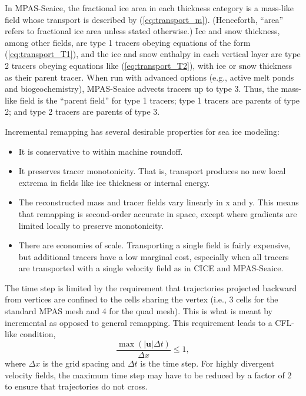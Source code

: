 In MPAS-Seaice, the fractional ice area in each thickness category is a mass-like field whose transport is described by (\ref{eq:transport_m}). (Henceforth, ``area'' refers to fractional ice area unless stated otherwise.) Ice and snow thickness, among other fields, are type 1 tracers obeying equations of the form (\ref{eq:transport_T1}), and the ice and snow enthalpy in each vertical layer are type 2 tracers obeying equations like (\ref{eq:transport_T2}), with ice or snow thickness as their parent tracer. When run with advanced options (e.g., active melt ponds and biogeochemistry), MPAS-Seaice advects tracers up to type 3. Thus, the mass-like field is the ``parent field'' for type 1 tracers; type 1 tracers are parents of type 2; and type 2 tracers are parents of type 3.

Incremental remapping has several desirable properties for sea ice modeling:
\begin{itemize}
\item It is conservative to within machine roundoff.
\item It preserves tracer monotonicity.  That is, transport produces no new local extrema in fields like ice thickness or internal energy. 
\item The reconstructed mass and tracer fields vary linearly in x and y. This means that remapping is second-order accurate in space, except where gradients are limited locally to preserve monotonicity.
\item There are economies of scale.  Transporting a single field is fairly expensive, but additional tracers have a low marginal cost, especially when all tracers are transported with a single velocity field as in CICE and MPAS-Seaice.
\end{itemize}

The time step is limited by the requirement that trajectories projected backward from vertices are confined to the cells sharing the vertex (i.e., 3 cells for the standard MPAS mesh and 4 for the quad mesh).  This is what is meant by incremental as opposed to general remapping. This requirement leads to a CFL-like condition,
\begin{equation}
\label{eq:IR_CFL}
\frac{\max (|\mathbf{u}|\Delta t)}{\Delta x}\le 1,
\end{equation}
where $\Delta x$ is the grid spacing and $\Delta t$ is the time step. For highly divergent velocity fields, the maximum time step may have to be reduced by a factor of 2 to ensure that trajectories do not cross. 

